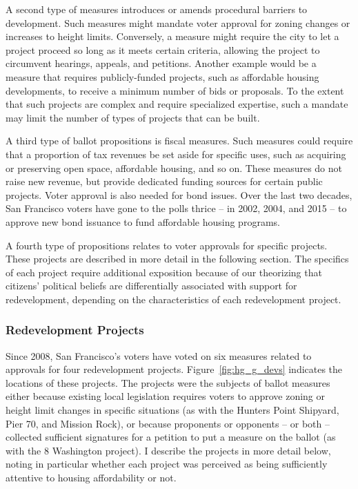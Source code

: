 \documentclass[article,12pt]{memoir}
\begin{document}
A second type of measures introduces or amends procedural barriers to development. Such measures might mandate voter approval for zoning changes or increases to height limits.  Conversely, a measure might require the city to let a project proceed so long as it meets certain criteria, allowing the project to circumvent hearings, appeals, and petitions.  Another example would be a measure that requires publicly-funded projects, such as affordable housing developments, to receive a minimum number of bids or proposals. To the extent that such projects are complex and require specialized expertise, such a mandate may limit the number of types of projects that can be built.

A third type of ballot propositions is fiscal measures. Such measures could require that a proportion of tax revenues be set aside for specific uses, such as acquiring or preserving open space, affordable housing, and so on.  These measures do not raise new revenue, but provide dedicated funding sources for certain public projects. Voter approval is also needed for bond issues. Over the last two decades, San Francisco voters have gone to the polls thrice -- in 2002, 2004, and 2015 -- to approve new bond issuance to fund affordable housing programs.

A fourth type of propositions relates to voter approvals for specific projects. These projects are described in more detail in the following section.  The specifics of each project require additional exposition because of our theorizing that citizens' political beliefs are differentially associated with support for redevelopment, depending on the characteristics of each redevelopment project.

\subsubsection{Redevelopment Projects}\label{sec:hg_g_redev}

Since 2008, San Francisco's voters have voted on six measures related to approvals for four redevelopment projects. Figure~\ref{fig:hg_g_devs} indicates the locations of these projects. The projects were the subjects of ballot measures either because existing local legislation requires voters to approve zoning or height limit changes in specific situations (as with the Hunters Point Shipyard, Pier 70, and Mission Rock), or because proponents or opponents -- or both -- collected sufficient signatures for a petition to put a measure on the ballot (as with the 8 Washington project).  I describe the projects in more detail below, noting in particular whether each project was perceived as being sufficiently attentive to housing affordability or not.
\end{document}
